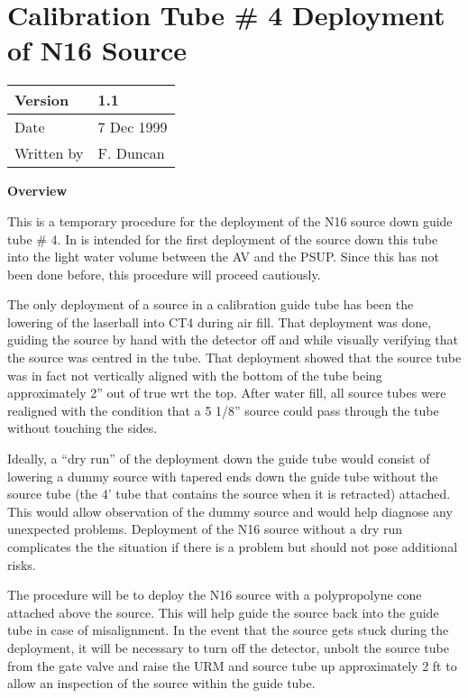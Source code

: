 




\newpage
\section{Calibration Tube \# 4 Deployment of N16 Source}
  
\begin{center}
\begin{tabular}{|l|l|}
\hline
Version    & 1.1 \\
\hline
Date       & 7 Dec 1999\\
\hline
Written by & F. Duncan\\
\hline
\end{tabular}
\end{center}
 
\noindent
{\bf Overview}

 
  This is a temporary procedure for the deployment of the N16
source down guide tube \# 4.  In is intended for the first deployment
of the source down this tube into the light water volume between
the AV and the PSUP.  Since this has not been done before, this procedure
will proceed cautiously.
  

  The only deployment of a source in a calibration guide tube
has been the lowering of the laserball into CT4 during air fill.
That deployment was done, guiding the source by hand with the
detector off and while visually verifying that the source was
centred in the tube.  That deployment showed that the source tube
was in fact not vertically aligned with the bottom of the tube
being approximately 2'' out of true wrt the top.  After water fill,
all source tubes were realigned with the condition that a 5 1/8''
source could pass through the tube without touching the sides.

  
  Ideally, a ``dry run'' of the deployment down the guide tube would
consist of lowering a dummy source with tapered ends down the guide 
tube without the source tube (the 4' tube that contains the
source when it is retracted) attached.  This would allow observation
of the dummy source and would help diagnose any unexpected problems.  
  Deployment of the N16 source without a dry run complicates the
the situation if there is a problem but should not pose additional
risks.
  
  The procedure will be to deploy the N16 source with a polypropolyne
cone attached above the source.  This will help guide the source
back into the guide tube in case of misalignment.  In the event that
the source gets stuck during the deployment, it will be necessary to
turn off the detector, unbolt the source tube from the gate valve
and raise the URM and source tube up approximately 2 ft to allow
an inspection of the source within the guide tube.

